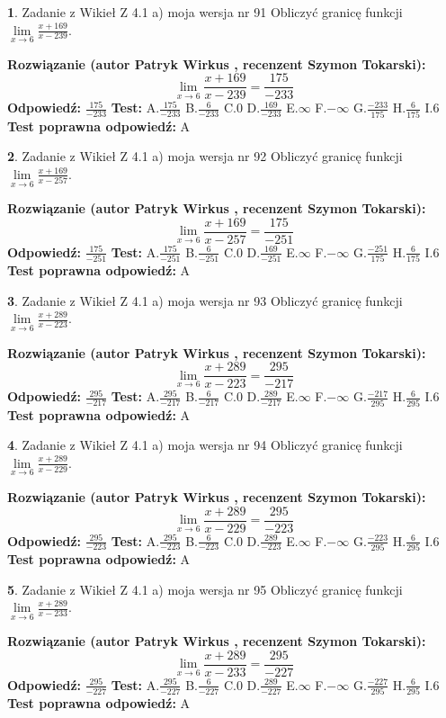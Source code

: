 \documentclass[12pt, a4paper]{article}
\theoremstyle{definition} %
\newtheorem{zad}{}
\newcommand{\zadStart}[1]{\begin{zad}#1\newline}
\newcommand{\zadStop}{\end{zad}}
\newcommand{\rozwStart}[2]{\noindent \textbf{Rozwiązanie (autor #1 , recenzent #2): }\newline}
\newcommand{\rozwStop}{\newline}
\newcommand{\odpStart}{\noindent \textbf{Odpowiedź:}\newline}
\newcommand{\odpStop}{\newline}
\newcommand{\testStart}{\noindent \textbf{Test:}\newline}
\newcommand{\testStop}{\newline}
\newcommand{\kluczStart}{\noindent \textbf{Test poprawna odpowiedź:}\newline}
\newcommand{\kluczStop}{\newline}
\begin{document}
\zadStart{Zadanie z Wikieł Z 4.1 a) moja wersja nr 91}
Obliczyć granicę funkcji $\lim\limits_{x\to6}\frac{x+169}{x-239}$.
\zadStop
\rozwStart{Patryk Wirkus}{Szymon Tokarski}
$$\lim\limits_{x\to6}\frac{x+169}{x-239} = \frac{175}{-233}$$
\rozwStop
\odpStart
$\frac{175}{-233}$
\odpStop
\testStart
A.$\frac{175}{-233}$
B.$\frac{6}{-233}$
C.$0$
D.$\frac{169}{-233}$
E.$\infty$
F.$-\infty$
G.$\frac{-233}{175}$
H.$\frac{6}{175}$
I.$6$
\testStop
\kluczStart
A
\kluczStop



\zadStart{Zadanie z Wikieł Z 4.1 a) moja wersja nr 92}
Obliczyć granicę funkcji $\lim\limits_{x\to6}\frac{x+169}{x-257}$.
\zadStop
\rozwStart{Patryk Wirkus}{Szymon Tokarski}
$$\lim\limits_{x\to6}\frac{x+169}{x-257} = \frac{175}{-251}$$
\rozwStop
\odpStart
$\frac{175}{-251}$
\odpStop
\testStart
A.$\frac{175}{-251}$
B.$\frac{6}{-251}$
C.$0$
D.$\frac{169}{-251}$
E.$\infty$
F.$-\infty$
G.$\frac{-251}{175}$
H.$\frac{6}{175}$
I.$6$
\testStop
\kluczStart
A
\kluczStop



\zadStart{Zadanie z Wikieł Z 4.1 a) moja wersja nr 93}
Obliczyć granicę funkcji $\lim\limits_{x\to6}\frac{x+289}{x-223}$.
\zadStop
\rozwStart{Patryk Wirkus}{Szymon Tokarski}
$$\lim\limits_{x\to6}\frac{x+289}{x-223} = \frac{295}{-217}$$
\rozwStop
\odpStart
$\frac{295}{-217}$
\odpStop
\testStart
A.$\frac{295}{-217}$
B.$\frac{6}{-217}$
C.$0$
D.$\frac{289}{-217}$
E.$\infty$
F.$-\infty$
G.$\frac{-217}{295}$
H.$\frac{6}{295}$
I.$6$
\testStop
\kluczStart
A
\kluczStop



\zadStart{Zadanie z Wikieł Z 4.1 a) moja wersja nr 94}
Obliczyć granicę funkcji $\lim\limits_{x\to6}\frac{x+289}{x-229}$.
\zadStop
\rozwStart{Patryk Wirkus}{Szymon Tokarski}
$$\lim\limits_{x\to6}\frac{x+289}{x-229} = \frac{295}{-223}$$
\rozwStop
\odpStart
$\frac{295}{-223}$
\odpStop
\testStart
A.$\frac{295}{-223}$
B.$\frac{6}{-223}$
C.$0$
D.$\frac{289}{-223}$
E.$\infty$
F.$-\infty$
G.$\frac{-223}{295}$
H.$\frac{6}{295}$
I.$6$
\testStop
\kluczStart
A
\kluczStop



\zadStart{Zadanie z Wikieł Z 4.1 a) moja wersja nr 95}
Obliczyć granicę funkcji $\lim\limits_{x\to6}\frac{x+289}{x-233}$.
\zadStop
\rozwStart{Patryk Wirkus}{Szymon Tokarski}
$$\lim\limits_{x\to6}\frac{x+289}{x-233} = \frac{295}{-227}$$
\rozwStop
\odpStart
$\frac{295}{-227}$
\odpStop
\testStart
A.$\frac{295}{-227}$
B.$\frac{6}{-227}$
C.$0$
D.$\frac{289}{-227}$
E.$\infty$
F.$-\infty$
G.$\frac{-227}{295}$
H.$\frac{6}{295}$
I.$6$
\testStop
\kluczStart
A
\kluczStop
\end{document}

